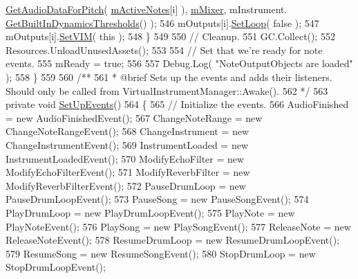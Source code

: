 \begin{DoxyCodeInclude}
      \hyperlink{group___v_i_base_pub_func_gaf715f7c3bbd2f1a2fa543b2f0684f8a6}{GetAudioDataForPitch}( \hyperlink{group___v_i_m_priv_ga5cedf9995d59b416412677e6004b659c}{mActiveNotes}[i] ), \hyperlink{group___v_i_m_priv_ga08c8db1bb89f4ab1e28451dd93d6b99c}{mMixer}, mInstrument.
      \hyperlink{group___v_i_base_pub_func_gac8fc20c49c1b97b6787ed1b3e0073a7f}{GetBuiltInDynamicsThresholds}() );
546             mOutputs[i].\hyperlink{group___n_o_o_pub_func_ga7b79bbd2c7a68831b322edff140f29d2}{SetLoop}( \textcolor{keyword}{false} );
547             mOutputs[i].\hyperlink{group___n_o_o_pub_func_gaca261a6f8d95fc7f81bbc3c8108bad58}{SetVIM}( \textcolor{keyword}{this} );
548         \}
549 
550         \textcolor{comment}{// Cleanup.}
551         GC.Collect();
552         Resources.UnloadUnusedAssets();
553 
554         \textcolor{comment}{// Set that we're ready for note events.}
555         mReady = \textcolor{keyword}{true};
556 
557         Debug.Log( \textcolor{stringliteral}{"NoteOutputObjects are loaded"} );
558     \}
559 \textcolor{comment}{}
560 \textcolor{comment}{    /** }
561 \textcolor{comment}{     * @brief Sets up the events and adds their listeners. Should only be called from
       VirtualInstrumentManager::Awake().}
562 \textcolor{comment}{    */}
563     \textcolor{keyword}{private} \textcolor{keywordtype}{void} \hyperlink{group___v_i_m_priv_func_gaa207d18111d38374017c580de4077589}{SetUpEvents}()
564     \{
565         \textcolor{comment}{// Initialize the events.}
566         AudioFinished = \textcolor{keyword}{new} AudioFinishedEvent();
567         ChangeNoteRange = \textcolor{keyword}{new} ChangeNoteRangeEvent();
568         ChangeInstrument = \textcolor{keyword}{new} ChangeInstrumentEvent();
569         InstrumentLoaded = \textcolor{keyword}{new} InstrumentLoadedEvent();
570         ModifyEchoFilter = \textcolor{keyword}{new} ModifyEchoFilterEvent();
571         ModifyReverbFilter = \textcolor{keyword}{new} ModifyReverbFilterEvent();
572         PauseDrumLoop = \textcolor{keyword}{new} PauseDrumLoopEvent();
573         PauseSong = \textcolor{keyword}{new} PauseSongEvent();
574         PlayDrumLoop = \textcolor{keyword}{new} PlayDrumLoopEvent();
575         PlayNote = \textcolor{keyword}{new} PlayNoteEvent();
576         PlaySong = \textcolor{keyword}{new} PlaySongEvent();
577         ReleaseNote = \textcolor{keyword}{new} ReleaseNoteEvent();
578         ResumeDrumLoop = \textcolor{keyword}{new} ResumeDrumLoopEvent();
579         ResumeSong = \textcolor{keyword}{new} ResumeSongEvent();
580         StopDrumLoop = \textcolor{keyword}{new} StopDrumLoopEvent();

\end{DoxyCodeInclude}
